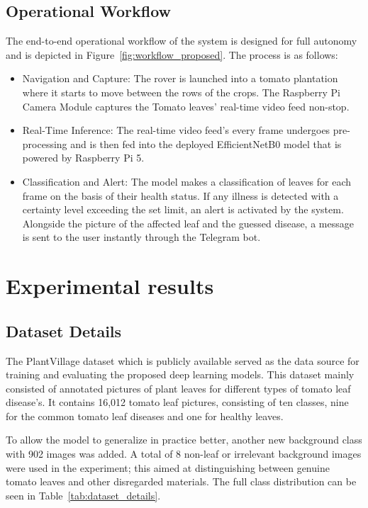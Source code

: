 \documentclass[pdflatex,sn-mathphys-num,iicol]{sn-jnl} %
\theoremstyle{thmstyleone}
\theoremstyle{thmstyletwo}
\theoremstyle{thmstylethree}
\begin{document}
\subsection{Operational Workflow}

The end-to-end operational workflow of the system is designed for full autonomy and is depicted in Figure~\ref{fig:workflow_proposed}. The process is as follows:

\begin{itemize}
    \item Navigation and Capture: The rover is launched into a tomato plantation where it starts to move between the rows of the crops. The Raspberry Pi Camera Module captures the Tomato leaves’ real-time video feed non-stop.
    
    \item Real-Time Inference: The real-time video feed’s every frame undergoes pre-processing and is then fed into the deployed EfficientNetB0 model that is powered by Raspberry Pi 5.

    \item Classification and Alert: The model makes a classification of leaves for each frame on the basis of their health status. If any illness is detected with a certainty level exceeding the set limit, an alert is activated by the system. Alongside the picture of the affected leaf and the guessed disease, a message is sent to the user instantly through the Telegram bot.
\end{itemize}

\section{Experimental results}
\label{sec:4}

\subsection{Dataset Details}

The PlantVillage dataset which is publicly available served as the data source for training and evaluating the proposed deep learning models. This dataset mainly consisted of annotated pictures of plant leaves for different types of tomato leaf disease's. It contains 16,012 tomato leaf pictures, consisting of ten classes, nine for the common tomato leaf diseases and one for healthy leaves.

To allow the model to generalize in practice better, another new background class with 902 images was added. A total of 8 non-leaf or irrelevant background images were used in the experiment; this aimed at distinguishing between genuine tomato leaves and other disregarded materials. The full class distribution can be seen in Table~\ref{tab:dataset_details}.
\end{document}
